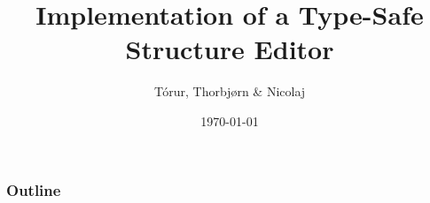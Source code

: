 \documentclass{beamer}
\title{Implementation of a Type-Safe Structure Editor}
\author{Tórur, Thorbjørn \& Nicolaj}
\institute{University of Copenhagen}
\date{\today}
\begin{document}


\begin{frame}
    \titlepage
\end{frame}

\begin{frame}
    \frametitle{Outline}
    \tableofcontents
\end{frame}













\begin{frame}
    
\end{frame}
\end{document}
